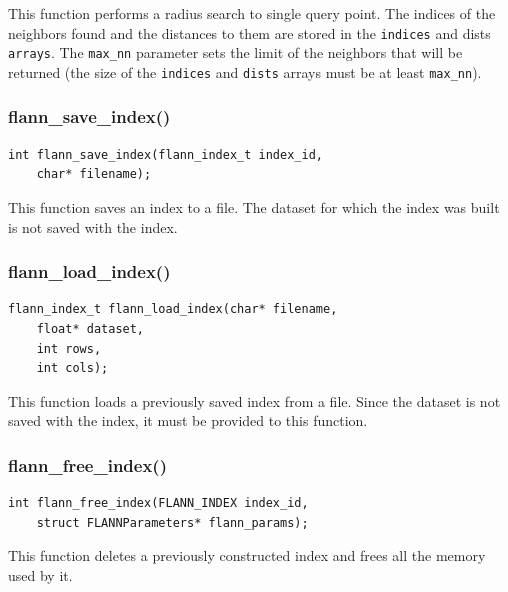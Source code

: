 \documentclass[letter,10pt]{article}
\begin{document}
This function performs a radius search to single query point. The indices of the neighbors found and
the distances to them are stored in the \texttt{indices} and dists \texttt{arrays}. The \texttt{max\_nn} parameter sets the limit of the
neighbors that will be returned (the size of the \texttt{indices} and \texttt{dists} arrays must be at least \texttt{max\_nn}).

\subsubsection{flann\_save\_index()}
\begin{Verbatim}[fontsize=\footnotesize,frame=single]
int flann_save_index(flann_index_t index_id,
	char* filename);
\end{Verbatim}

This function saves an index to a file. The dataset for which the index was built is not saved with the index.

\subsubsection{flann\_load\_index()}
\begin{Verbatim}[fontsize=\footnotesize,frame=single]
flann_index_t flann_load_index(char* filename,
	float* dataset,
	int rows,
	int cols);
\end{Verbatim}

This function loads a previously saved index from a file. Since the dataset is not saved with the
index, it must be provided to this function.



\subsubsection{flann\_free\_index()}
\begin{Verbatim}[fontsize=\footnotesize,frame=single]
int flann_free_index(FLANN_INDEX index_id,
	struct FLANNParameters* flann_params);
\end{Verbatim}
This function deletes a previously constructed index and frees all the memory
used by it.
\end{document}
